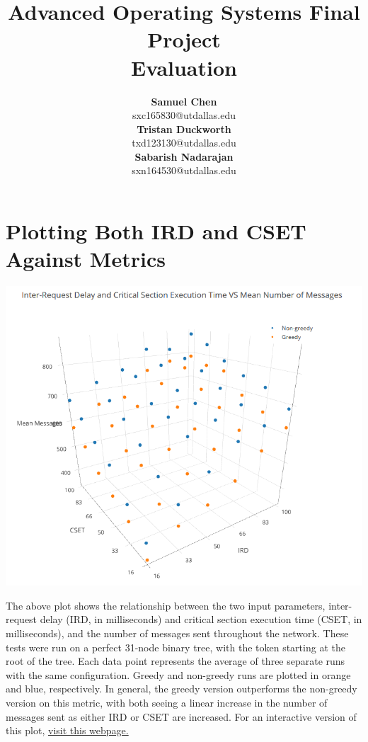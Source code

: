 \documentclass{article}
\author{\textbf{Samuel Chen} \\ sxc165830@utdallas.edu \\\textbf{Tristan Duckworth} \\ txd123130@utdallas.edu \\\textbf{Sabarish Nadarajan} \\ sxn164530@utdallas.edu}
\title{\huge{Advanced Operating Systems Final Project} \\ \LARGE{Evaluation}}
\begin{document}
\maketitle

\section{Plotting Both IRD and CSET Against Metrics}

\begin{center}
    \includegraphics[width=\textwidth]{figs/IRDCSETvsMNM} \\
\end{center}

The above plot shows the relationship between the two input parameters, inter-request delay (IRD, in milliseconds) and critical section execution time (CSET, in milliseconds), and the number of messages sent throughout the network. These tests were run on a perfect 31-node binary tree, with the token starting at the root of the tree. Each data point represents the average of three separate runs with the same configuration. Greedy and non-greedy runs are plotted in orange and blue, respectively. In general, the greedy version outperforms the non-greedy version on this metric, with both seeing a linear increase in the number of messages sent as either IRD or CSET are increased. For an interactive version of this plot, \href{https://plot.ly/~tgduckworth/3/#plot}{visit this webpage.}
\end{document}

